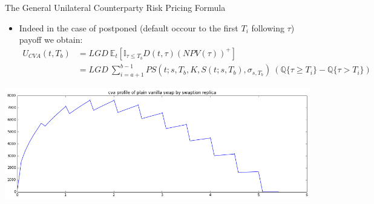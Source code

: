 \documentclass[11pt]{beamer}
\begin{document}
\begin{frame}{The General Unilateral Counterparty Risk Pricing Formula}
\begin{itemize}
\item Indeed in the case of postponed (default occour to the first $T_i$ following $\tau$) payoff we obtain:
\footnotesize
\begin{equation}
\begin{split}
U_{CVA}(t,T_b) &= LGD \> \mathbb{E}_t [ \mathbb{I}_{\tau \le T_b} D(t,\tau) (NPV(\tau))^+ ] \\
&= LGD \> \sum\limits_{i=a+1}^{b-1} PS \left( t;s,T_b,K,S(t;s,T_b), \sigma_{s,T_b} \right) 
\> \left( \mathbb{Q} \{\tau \ge T_i \} - \mathbb{Q} \{\tau > T_i \} \right)
\end{split}
\end{equation}
\normalsize
\end{itemize}
\includegraphics[scale=.4]{img/profile_1.png} 
\end{frame}
\end{document}
